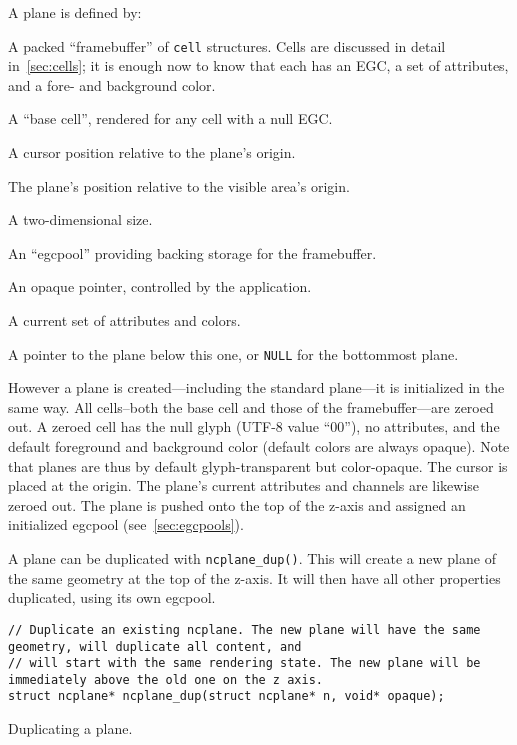 A plane is defined by:
\begin{denseitemize}
\item{A packed ``framebuffer'' of \texttt{cell} structures. Cells are discussed
    in detail in~\ref{sec:cells}; it is enough now to know that each has an
    EGC, a set of attributes, and a fore- and background color.}
\item{A ``base cell'', rendered for any cell with a null EGC.}
\item{A cursor position relative to the plane's origin.}
\item{The plane's position relative to the visible area's origin.}
\item{A two-dimensional size.}
\item{An ``egcpool'' providing backing storage for the framebuffer.}
\item{An opaque pointer, controlled by the application.}
\item{A current set of attributes and colors.}
\item{A pointer to the plane below this one, or \texttt{NULL} for the bottommost plane.}
\end{denseitemize}

However a plane is created---including the standard plane---it is initialized
in the same way. All cells--both the base cell and those of the
framebuffer---are zeroed out. A zeroed cell has the null glyph (UTF-8
value ``00''), no attributes, and the default foreground and background color
(default colors are always opaque). Note that planes are thus by default
glyph-transparent but color-opaque. The cursor is placed at the origin. The
plane's current attributes and channels are likewise zeroed out. The plane is
pushed onto the top of the z-axis and assigned an initialized egcpool
(see~\ref{sec:egcpools}).

A plane can be duplicated with \texttt{ncplane\_dup()}. This will create a new
plane of the same geometry at the top of the z-axis. It will then have all
other properties duplicated, using its own egcpool.
\begin{listing}[!htb]
\begin{verbatim}
// Duplicate an existing ncplane. The new plane will have the same geometry, will duplicate all content, and
// will start with the same rendering state. The new plane will be immediately above the old one on the z axis.
struct ncplane* ncplane_dup(struct ncplane* n, void* opaque);
\end{verbatim}
\caption{Duplicating a plane.}
\end{listing}

